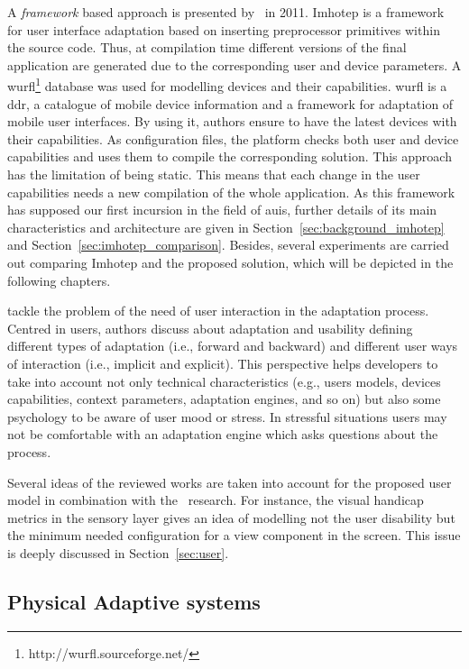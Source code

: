 A \textit{framework} based approach is presented by~\citet{almeida_imhotep_2011}
in 2011. Imhotep is a framework for user interface adaptation based on inserting
preprocessor primitives within the source code. Thus, at compilation time
different versions of the final application are generated due to the corresponding
user and device parameters. A \ac{wurfl}\footnote{http://wurfl.sourceforge.net/} 
database was used for modelling devices and their capabilities. \ac{wurfl} is a 
\ac{ddr}, a catalogue of mobile device information and a framework for adaptation 
of mobile user interfaces. By using it, authors ensure to have the latest devices 
with their capabilities. As configuration files, the platform checks both user 
and device capabilities and uses them to compile the corresponding solution. This 
approach has the limitation of being static. This means that each change in the 
user capabilities needs a new compilation of the whole application. As this
framework has supposed our first incursion in the field of \acp{aui}, further
details of its main characteristics and architecture are given in Section~\ref{sec:background_imhotep}
and Section~\ref{sec:imhotep_comparison}. Besides, several experiments are
carried out comparing Imhotep and the proposed solution, which will be depicted
in the following chapters.

\citet{evers_achieving_2012} tackle the problem of the need of user interaction 
in the adaptation process. Centred in users, authors discuss about adaptation 
and usability defining different types of adaptation (i.e., forward and backward) 
and different user ways of interaction (i.e., implicit and explicit). This 
perspective helps developers to take into account not only technical 
characteristics (e.g., users models, devices capabilities, context parameters, 
adaptation engines, and so on) but also some psychology to be aware of user mood 
or stress. In stressful situations users may not be comfortable with an adaptation 
engine which asks questions about the process.

Several ideas of the reviewed works are taken into account for the proposed user 
model in combination with the~\citet{casas_user_2008} research. For instance,
the visual handicap metrics in the sensory layer gives an idea of modelling
not the user disability but the minimum needed configuration for a view component
in the screen. This issue is deeply discussed in Section~\ref{sec:user}.

\subsection{Physical Adaptive systems}
\label{sec:pyshical_adaptive_sistems}

